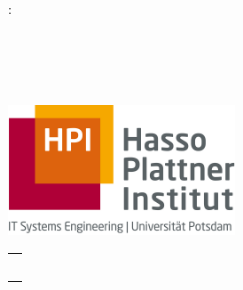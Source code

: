 \newenvironment{myepigraph}
  {\par\hfill
   \begin{tabular}{@{}r@{\hspace{13em}}}}
  {\end{tabular}\par\medskip}

\begin{titlepage}
	\begin{addmargin}[-1cm]{-3cm}
    \begin{center}
        \hfill

        \vfill

        \begingroup
          \color{Maroon}\spacedallcaps{\myTitle}:\\
          \color{Maroon}\spacedallcaps{\mySubtitle}\\[1em]
          \color{Black}\spacedlowsmallcaps{\myTitleGer}
          \\[3em]
        \endgroup

        {\color{Black}\spacedlowsmallcaps{\myName}\\
        \spacedlowsmallcaps{\myTime}}

        \hfill



        \vfill

        \includegraphics[width=6cm]{gfx/logo.jpg} \\[2ex]
        \begin{myepigraph}
        \spacedlowsmallcaps{Supervised by}\\
        \myProf\\
        \mySupervisorA\\
        \mySupervisorB\\
        \spacedlowsmallcaps{\myFaculty}
        \end{myepigraph}

        \vfill

    \end{center}
  \end{addmargin}
\end{titlepage}